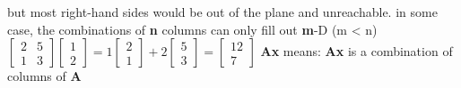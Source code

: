 \documentclass[12pt, a4paper]{article}
\begin{document}
\newline
but most right-hand sides would be out of the plane and unreachable.
\vspace{14pt}
\newline
in some case, the combinations of {\bf{n}} columns can only fill out {\bf{m}}-D (m < n)
\vspace{14pt}
\newline
\begin{math}
\begin{bmatrix}
	2 & 5 \\
	1 & 3 
\end{bmatrix}
\begin{bmatrix}
	1 \\
	2 
\end{bmatrix}
 = 
1
\begin{bmatrix}
	2 \\
	1 
\end{bmatrix}
 + 
2
\begin{bmatrix}
	5 \\
	3 
\end{bmatrix}
 = 
\begin{bmatrix}
	12 \\
	7 
\end{bmatrix}
\end{math}
\newline
{\bf{A}}{\bf{x}} means: {\bf{A}}{\bf{x}} is a combination of columns of {\bf{A}}
\end{document}

